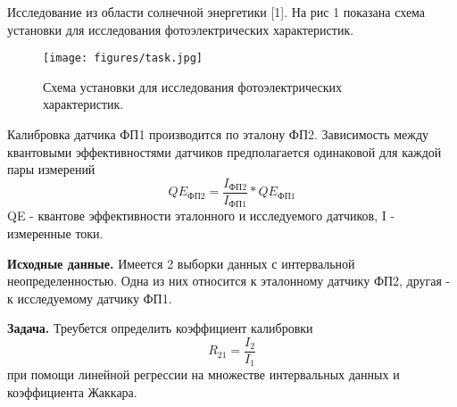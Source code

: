 \documentclass[../main.tex]{subfiles}
\begin{document}
    Исследование из области солнечной энергетики [1]. На рис 1 показана схема установки для исследования фотоэлектрических характеристик.
    \begin{figure}[H]
    	\centering
    	    \texttt{[image: figures/task.jpg]}
    	\caption{Схема установки для исследования фотоэлектрических характеристик.}
    	\label{w_pert}
    \end{figure}
    
    Калибровка датчика ФП1 производится по эталону ФП2. Зависимость между квантовыми эффективностями датчиков предполагается одинаковой для каждой пары измерений
    \begin{equation}
        QE_{ФП2} = \frac{I_{ФП2}}{I_{ФП1}}*QE_{ФП1} 
        \label{T}
    \end{equation}
    QE - квантове эффективности эталонного и исследуемого датчиков, I - измеренные токи.
    
    \textbf{Исходные данные.}
    Имеется 2 выборки данных с интервальной неопределенностью. Одна из них относится к эталонному датчику ФП2, другая - к исследуемому датчику ФП1.
    
    \textbf{Задача.}
    Треубется определить коэффициент калибровки
    \begin{equation}
        R_{21} = \frac{I_{2}}{I_{1}}
        \label{T}
    \end{equation}
    при помощи линейной регрессии на множестве интервальных данных и коэффициента Жаккара.
\end{document}
